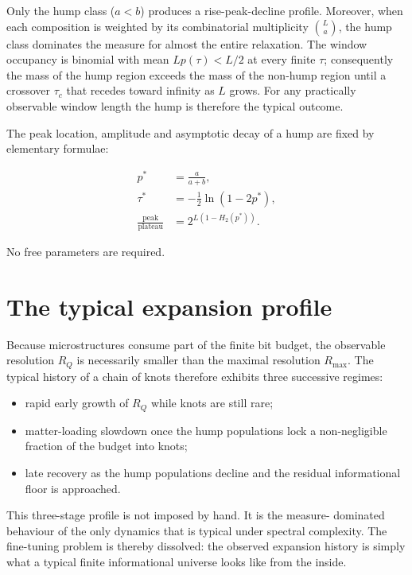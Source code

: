 \documentclass[11pt]{article}
\begin{document}
Only the hump class (\(a<b\)) produces a rise-peak-decline profile. 
Moreover, when each composition is weighted by its combinatorial 
multiplicity \(\binom{L}{a}\), the hump class dominates the measure 
for almost the entire relaxation. The window occupancy is binomial 
with mean \(Lp(\tau)<L/2\) at every finite \(\tau\); consequently the 
mass of the hump region exceeds the mass of the non-hump region until 
a crossover \(\tau_c\) that recedes toward infinity as \(L\) grows. 
For any practically observable window length the hump is therefore 
the typical outcome.

The peak location, amplitude and asymptotic decay of a hump are fixed 
by elementary formulae:

\[
\begin{aligned}
p^* &= \frac{a}{a+b}, \\[6pt]
\tau^* &= -\frac{1}{2}\ln(1-2p^*), \\[6pt]
\frac{\text{peak}}{\text{plateau}}
    &= 2^{L(1-H_2(p^*))}.
\end{aligned}
\]

No free parameters are required.

\section{The typical expansion profile}

Because microstructures consume part of the finite bit budget, the 
observable resolution \(R_Q\) is necessarily smaller than the maximal 
resolution \(R_{\mathrm{max}}\). The typical history of a chain of 
knots therefore exhibits three successive regimes:

\begin{itemize}
  \item rapid early growth of \(R_Q\) while knots are still rare;
  \item matter-loading slowdown once the hump populations lock a 
        non-negligible fraction of the budget into knots;
  \item late recovery as the hump populations decline and the residual 
        informational floor is approached.
\end{itemize}

This three-stage profile is not imposed by hand. It is the measure-
dominated behaviour of the only dynamics that is typical under spectral 
complexity. The fine-tuning problem is thereby dissolved: the observed 
expansion history is simply what a typical finite informational universe 
looks like from the inside.
\end{document}
